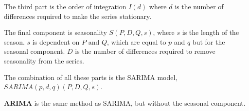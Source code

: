   The third part is the order of integration $I(d)$ where $d$ is the number of
  differences required to make the series stationary.

  The final component is seasonality $S(P, D, Q, s)$, where $s$ is the length
  of the season.
  $s$ is dependent on $P$ and $Q$, which are equal to $p$ and $q$ but for the seasonal component.
  $D$ is the number of differences required to remove seasonality from the series.

  The combination of all these parts is the SARIMA model,
  $SARIMA(p, d, q)(P, D, Q, s)$.

  \textbf{ARIMA} is the same method as SARIMA, but without the seasonal component.
\fi